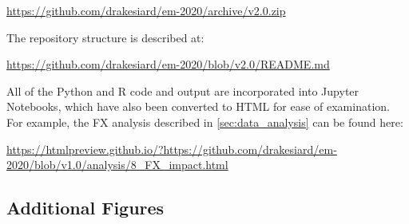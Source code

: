 \documentclass[12pt,a4paper]{article}
\begin{document}
\url{https://github.com/drakesiard/em-2020/archive/v2.0.zip}

\noindent
The repository structure is described at:

\url{https://github.com/drakesiard/em-2020/blob/v2.0/README.md}

\noindent
All of the Python and R code and output are incorporated into Jupyter Notebooks, which have also been converted to HTML for ease of examination. For example, the FX analysis described in \cref{sec:data_analysis} can be found here:

\begin{adjustbox}{max width=\textwidth}
\url{https://htmlpreview.github.io/?https://github.com/drakesiard/em-2020/blob/v1.0/analysis/8_FX_impact.html}
\end{adjustbox}

\clearpage
\subsection{Additional Figures}\label{sec:graph_appendix}

\listoffigures
\listoftables

\restoregeometry{}
\end{document}
